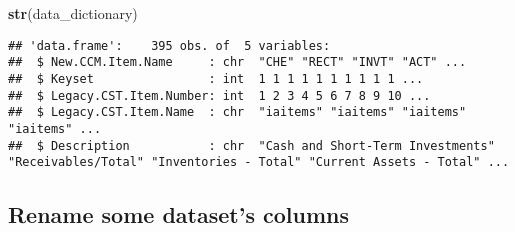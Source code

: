 \documentclass[
]{article}
\newenvironment{Shaded}{\begin{snugshade}}{\end{snugshade}}
\newcommand{\KeywordTok}[1]{\textcolor[rgb]{0.13,0.29,0.53}{\textbf{#1}}}
\newcommand{\NormalTok}[1]{#1}
\begin{document}
\begin{Shaded}
\begin{Highlighting}[]
    \KeywordTok{str}\NormalTok{(data_dictionary)}
\end{Highlighting}
\end{Shaded}

\begin{verbatim}
## 'data.frame':    395 obs. of  5 variables:
##  $ New.CCM.Item.Name     : chr  "CHE" "RECT" "INVT" "ACT" ...
##  $ Keyset                : int  1 1 1 1 1 1 1 1 1 1 ...
##  $ Legacy.CST.Item.Number: int  1 2 3 4 5 6 7 8 9 10 ...
##  $ Legacy.CST.Item.Name  : chr  "iaitems" "iaitems" "iaitems" "iaitems" ...
##  $ Description           : chr  "Cash and Short-Term Investments" "Receivables/Total" "Inventories - Total" "Current Assets - Total" ...
\end{verbatim}

\hypertarget{rename-some-datasets-columns}{%
\subsection{Rename some dataset's
columns}\label{rename-some-datasets-columns}}
\end{document}
